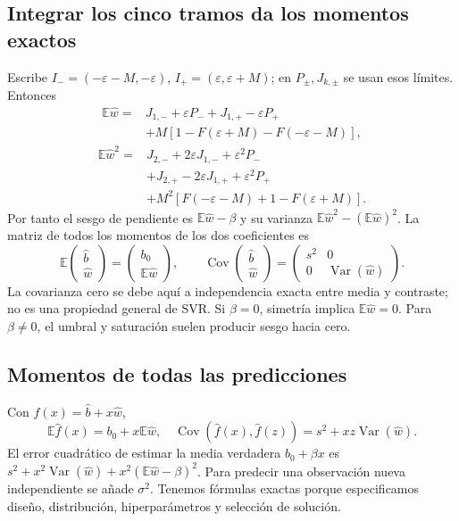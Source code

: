 \documentclass[11pt,a4paper]{article}
\newcommand{\E}{\mathbb E}
\DeclareMathOperator{\Var}{Var}
\DeclareMathOperator{\Cov}{Cov}
\theoremstyle{definition}
\begin{document}
\subsection{Integrar los cinco tramos da los momentos exactos}
Escribe $I_-=(-\varepsilon-M,-\varepsilon)$, $I_+=(\varepsilon,\varepsilon+M)$; en $P_\pm,J_{k,\pm}$ se usan esos límites. Entonces
\begin{align*}
\E\widehat w={}&J_{1,-}+\varepsilon P_-+J_{1,+}-\varepsilon P_+\\
&+M[1-F(\varepsilon+M)-F(-\varepsilon-M)],
\end{align*}
\begin{align*}
\E\widehat w^2={}&J_{2,-}+2\varepsilon J_{1,-}+\varepsilon^2P_-\\
&+J_{2,+}-2\varepsilon J_{1,+}+\varepsilon^2P_+\\
&+M^2[F(-\varepsilon-M)+1-F(\varepsilon+M)].
\end{align*}
Por tanto el sesgo de pendiente es $\E\widehat w-\beta$ y su varianza $\E\widehat w^2-(\E\widehat w)^2$. La matriz de todos los momentos de los dos coeficientes es
\[
\boxed{\E\begin{pmatrix}\widehat b\\\widehat w\end{pmatrix}
=\begin{pmatrix}b_0\\\E\widehat w\end{pmatrix},\qquad
\Cov\begin{pmatrix}\widehat b\\\widehat w\end{pmatrix}
=\begin{pmatrix}s^2&0\\0&\Var(\widehat w)\end{pmatrix}}.
\]
La covarianza cero se debe aquí a independencia exacta entre media y contraste; no es una propiedad general de SVR. Si $\beta=0$, simetría implica $\E\widehat w=0$. Para $\beta\ne0$, el umbral y saturación suelen producir sesgo hacia cero.
\subsection{Momentos de todas las predicciones}
Con $\widehat f(x)=\widehat b+x\widehat w$,
\[
\E\widehat f(x)=b_0+x\E\widehat w,
\quad\Cov(\widehat f(x),\widehat f(z))=s^2+xz\Var(\widehat w).
\]
El error cuadrático de estimar la media verdadera $b_0+\beta x$ es $s^2+x^2\Var(\widehat w)+x^2(\E\widehat w-\beta)^2$. Para predecir una observación nueva independiente se añade $\sigma^2$. Tenemos fórmulas exactas porque especificamos diseño, distribución, hiperparámetros y selección de solución.
\end{document}
